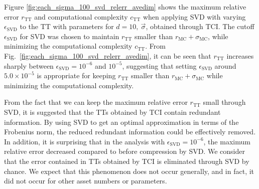 Figure \ref{fig:each_sigma_100_svd_relerr_avedim} shows the maximum relative error $r_{\mathrm{TT}}$ and computational complexity $c_{\mathrm{TT}}$ when applying SVD with varying $\epsilon_{\mathrm{SVD}}$ to the TT with parameters for $d = 10,~\vec{\sigma}$, obtained through TCI. 
The cutoff $\epsilon_{\text{SVD}}$ for SVD was chosen to maintain $r_{\mathrm{TT}}$ smaller than $r_{\mathrm{MC}} + \sigma_{\text{MC}}$, while minimizing the computational complexity $c_{\mathrm{TT}}$. 
From Fig.~\ref{fig:each_sigma_100_svd_relerr_avedim}, it can be seen that $r_{\mathrm{TT}}$ increases sharply between $\epsilon_{\mathrm{SVD}} = 10^{-6}$ and $10^{-5}$, suggesting that setting $\epsilon_{\text{SVD}}$ around $5.0 \times 10^{-5}$ is appropriate for keeping $r_{\mathrm{TT}}$ smaller than $r_{\mathrm{MC}} + \sigma_{\text{MC}}$ while minimizing the computational complexity.

From the fact that we can keep the maximum relative error $r_{\mathrm{TT}}$ small through SVD, it is suggested that the TTs obtained by TCI contain redundant information. By using SVD to get an optimal approximation in terms of the Frobenius norm, the reduced redundant information could be effectively removed. 
In addition, it is surprising that in the analysis with $\epsilon_{\text{SVD}} = 10^{-6}$, the maximum relative error decreased compared to before compression by SVD.
We consider that the error contained in TTs obtained by TCI is eliminated through SVD by chance.
We expect that this phenomenon does not occur generally, and in fact, it did not occur for other asset numbers or parameters.















